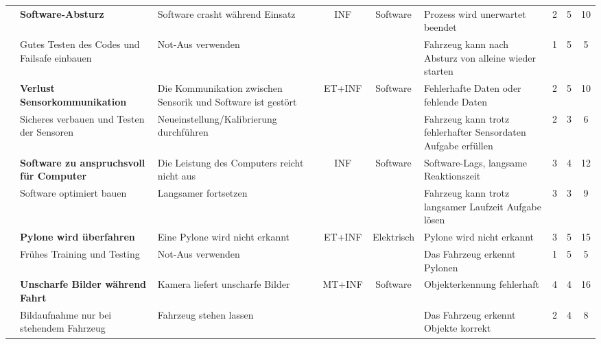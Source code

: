 \documentclass[../main.tex]{subfiles}
\begin{document}
\begin{landscape}
\begin{longtable}{|c|p{4.5cm}|p{5cm}|c|c|p{4.5cm}|c|c|c|}
\rowcolor[HTML]{F5F5F5} & \textbf{Software-Absturz} & Software crasht während Einsatz & INF & Software & Prozess wird unerwartet beendet & 2 & 5 & \cellcolor[HTML]{FFC000}10 \\* \cline{2-3} \cline{6-9}
\rowcolor[HTML]{F5F5F5} \multirow{-2}{*}{R7} & Gutes Testen des Codes und Failsafe einbauen & Not-Aus verwenden & & & Fahrzeug kann nach Absturz von alleine wieder starten & 1 & 5 & \cellcolor[HTML]{FFFF66}5 \\
\hline
\rowcolor{white} & \textbf{Verlust Sensorkommunikation} & Die Kommunikation zwischen Sensorik und Software ist gestört & ET+INF & Software & Fehlerhafte Daten oder fehlende Daten & 2 & 5 & \cellcolor[HTML]{FFC000}10 \\* \cline{2-3} \cline{6-9}
\rowcolor{white} \multirow{-2}{*}{R8} & Sicheres verbauen und Testen der Sensoren & Neueinstellung/Kalibrierung durchführen & & & Fahrzeug kann trotz fehlerhafter Sensordaten Aufgabe erfüllen & 2 & 3 & \cellcolor[HTML]{CCFF33}6 \\ \hline

\pagebreak

\rowcolor[HTML]{F5F5F5} & \textbf{Software zu anspruchsvoll für Computer} & Die Leistung des Computers reicht nicht aus & INF & Software & Software-Lags, langsame Reaktionszeit & 3 & 4 & \cellcolor[HTML]{FFC000}12 \\* \cline{2-3} \cline{6-9}
\rowcolor[HTML]{F5F5F5} \multirow{-2}{*}{R9} & Software optimiert bauen & Langsamer fortsetzen & & & Fahrzeug kann trotz langsamer Laufzeit Aufgabe lösen & 3 & 3 & \cellcolor[HTML]{CCFF33}9 \\ \hline
\rowcolor{white} & \textbf{Pylone wird überfahren} & Eine Pylone wird nicht erkannt & ET+INF & Elektrisch & Pylone wird nicht erkannt & 3 & 5 & \cellcolor[HTML]{FFC000}15 \\* \cline{2-3} \cline{6-9}
\rowcolor{white} \multirow{-2}{*}{R10} & Frühes Training und Testing & Not-Aus verwenden & & & Das Fahrzeug erkennt Pylonen & 1 & 5 & \cellcolor[HTML]{FFFF66}5 \\ \hline

\rowcolor[HTML]{F5F5F5} & \textbf{Unscharfe Bilder während Fahrt} & Kamera liefert unscharfe Bilder & MT+INF & Software & Objekterkennung fehlerhaft & 4 & 4 & \cellcolor[HTML]{FFC000}16 \\* \cline{2-3} \cline{6-9}
\rowcolor[HTML]{F5F5F5} \multirow{-2}{*}{R11} & Bildaufnahme nur bei stehendem Fahrzeug & Fahrzeug stehen lassen & & & Das Fahrzeug erkennt Objekte korrekt & 2 & 4 & \cellcolor[HTML]{FFFF66}8 \\ \hline


\end{longtable}
\end{landscape}
\end{document}
